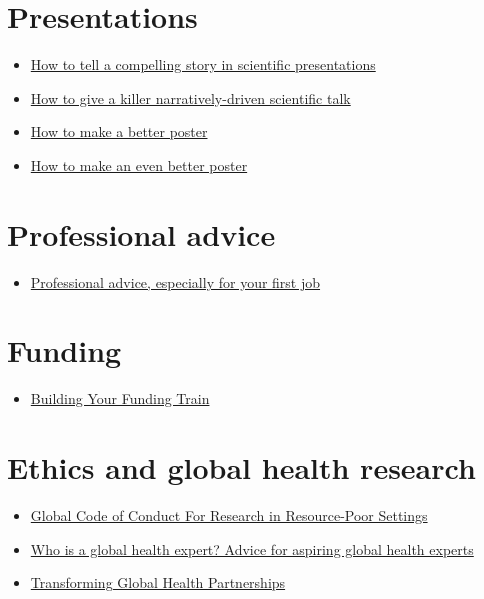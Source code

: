 \documentclass[
]{book}
\providecommand{\tightlist}{%
  \setlength{\itemsep}{0pt}\setlength{\parskip}{0pt}}
\begin{document}
\section{Presentations}\label{presentations}

\begin{itemize}
\tightlist
\item
  \href{https://www.nature.com/articles/d41586-021-03603-2}{How to tell a compelling story in scientific presentations}
\item
  \href{https://www-sciencedirect-com.stanford.idm.oclc.org/science/article/pii/S1471491423000928}{How to give a killer narratively-driven scientific talk}
\item
  \href{https://www.youtube.com/watch?v=1RwJbhkCA58&t=1171s}{How to make a better poster}
\item
  \href{https://mitcommlab.mit.edu/be/2023/09/27/toward-an-evenbetterposter-improving-the-betterposter-template/}{How to make an even better poster}
\end{itemize}

\section{Professional advice}\label{professional-advice}

\begin{itemize}
\tightlist
\item
  \href{https://docs.google.com/document/d/1ckgRCcr7FFPyymyMA6Y_-cB_vftOyrrxT28c6gRg0PI/edit}{Professional advice, especially for your first job}
\end{itemize}

\section{Funding}\label{funding}

\begin{itemize}
\tightlist
\item
  \href{https://grantwriting.stanford.edu/funding-train/\#ep}{Building Your Funding Train}
\end{itemize}

\section{Ethics and global health research}\label{ethics-and-global-health-research}

\begin{itemize}
\tightlist
\item
  \href{https://www.globalcodeofconduct.org/wp-content/uploads/2018/05/Global-Code-of-Conduct-Brochure.pdf}{Global Code of Conduct For Research in Resource-Poor Settings}
\item
  \href{https://journals.plos.org/globalpublichealth/article?id=10.1371/journal.pgph.0002269}{Who is a global health expert? Advice for aspiring global health experts}
\item
  \href{https://link.springer.com/book/9783031537929}{Transforming Global Health Partnerships}
\end{itemize}


\end{document}
